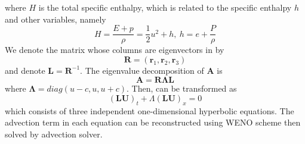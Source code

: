 where $H$ is the total specific enthalpy, which is related to the
specific enthalpy $h$ and other variables, namely 
\begin{equation}
H = \frac{E + p}{\rho} = \frac{1}{2}u^{2} + h,\ h = e + \frac{P}{\rho}
\end{equation}
We denote the matrix whose columns are eigenvectors in  by 
\begin{equation}
\mathbf{R} = \left(\mathbf{r}_{1},\mathbf{r}_{2},\mathbf{r}_{3}\right)
\end{equation}
and denote $\mathbf{L} = \mathbf{R}^{-1}$. The eigenvalue decomposition
of $\mathbf{A}$ is 
\begin{equation}
\mathbf{A} = \mathbf{R \Lambda L}
\end{equation}
where $\mathbf{\Lambda} = diag(u-c,u,u+c)$. Then,  can be 
transformed as 
\begin{equation}
\mathbf{(LU)}_{t} + \Lambda(\mathbf{LU})_{x} = 0
\label{eq:1d_transEuler}
\end{equation}
which consists of three independent one-dimensional hyperbolic equations. 
The advection term in each equation can be reconstructed using WENO scheme 
then solved by advection solver. 

